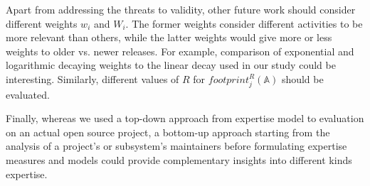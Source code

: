 Apart from addressing the threats to validity, other future work should consider different weights $w_i$ and $W_i$. The former weights consider different activities to be more relevant than others, while the latter weights would give more or less weights to older vs. newer releases. For example, comparison of exponential and logarithmic decaying weights to the linear decay used in our study could be interesting. Similarly, different values of $R$ for $footprint_j^R(\mathbb{A})$ should be evaluated.




Finally, whereas we used a top-down approach from expertise model to evaluation on an actual open source project, a bottom-up approach starting from the analysis of a project's or subsystem's maintainers before formulating expertise measures and models could provide complementary insights into different kinds expertise.









%
%

